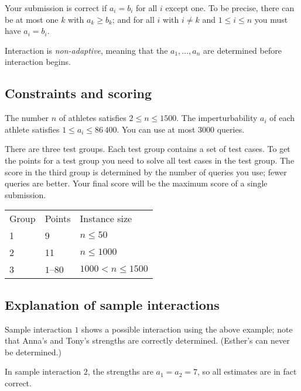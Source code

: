 Your submission is correct if $a_i=b_i$ for all $i$ except one.
To be precise, there can be at most one $k$ with $a_k\geq b_k$;
and for all $i$ with $i\neq k$ and $1\leq i\leq n$ you must have $a_i=b_i$.

Interaction is \emph{non-adaptive}, meaning that the $a_1,\ldots, a_n$ are determined before interaction begins.

\subsection*{Constraints and scoring}

The number $n$ of athletes satisfies $2\leq n\leq 1500$.
The imperturbability $a_i$ of each athlete satisfies $1\leq a_i\leq 86\,400$.
You can use at most $3000$ queries.

There are three test groups.
Each test group contains a set of test cases. 
To get the points for a test group you need to solve all test cases in the test group.
The score in the third group is determined by the number of queries you use;
fewer queries are better.
Your final score will be the maximum score of a single submission.

\medskip
\begin{tabular}{lll}
Group & Points & Instance size\\
1  &  9 & $n\leq 50$\\
2  &  11 & $n\leq 1000$\\
3  &  $1$--$80$ & $1000 < n\leq 1500$\\
\end{tabular}

\subsection*{Explanation of sample interactions}


Sample interaction $1$ shows a possible interaction using the above example; note that Anna's and Tony's strengths are correctly determined.
(Esther's can never be determined.)

In sample interaction $2$, the strengths are $a_1=a_2=7$, so all estimates are in fact correct.
